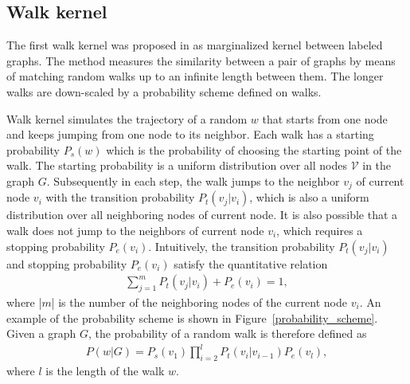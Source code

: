 \documentclass[english]{tktltiki}
\newcommand{\Vcal}{\mathcal{V}}
\begin{document}
\subsection{Walk kernel}
\label{kernel_methods_walk_kernel_sc}

The first walk kernel was proposed in \cite{kashima03} as marginalized kernel between labeled graphs. The method measures the similarity between a pair of graphs by means of matching random walks up to an infinite length between them. The longer walks are down-scaled by a probability scheme defined on walks. 

Walk kernel simulates the trajectory of a random $w$ that starts from one node and keeps jumping from one node to its neighbor. Each walk has a starting probability $P_s(w)$ which is the probability of choosing the starting point of the walk. The starting probability is a uniform distribution over all nodes $\Vcal$ in the graph $G$. Subsequently in each step, the walk jumps to the neighbor $v_j$ of current node $v_i$ with the transition probability $P_t(v_j|v_i)$, which is also a uniform distribution over all neighboring nodes of current node. It is also possible that a walk does not jump to the neighbors of current node $v_i$, which requires a stopping probability $P_e(v_i)$. Intuitively, the transition probability $P_t(v_j|v_i)$ and stopping probability $P_e(v_i)$ satisfy the quantitative relation
\begin{align*}
\sum_{j=1}^{m}{P_t(v_j|v_i) + P_e(v_i) = 1},
\end{align*} 
where |$m$| is the number of the neighboring nodes of the current node $v_i$. An example of the probability scheme is shown in Figure~\ref{probability_scheme}. Given a graph $G$, the probability of a random walk is therefore defined as
\begin{align*}
P(w|G) = P_s(v_1) \prod_{i=2}^{l}{P_t(v_i|v_{i-1}) P_e(v_l)},
\end{align*}
where $l$ is the length of the walk $w$.
\end{document}
